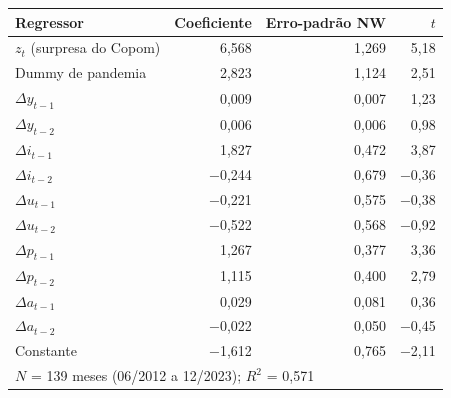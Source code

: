 \begin{tabular}{lrrr}
\toprule
Regressor & Coeficiente & Erro-padrão NW & $t$ \\
\midrule
$z_t$ (surpresa do Copom) & 6{,}568 & 1{,}269 & 5{,}18 \\
Dummy de pandemia & 2{,}823 & 1{,}124 & 2{,}51 \\
$\Delta y_{t-1}$ & 0{,}009 & 0{,}007 & 1{,}23 \\
$\Delta y_{t-2}$ & 0{,}006 & 0{,}006 & 0{,}98 \\
$\Delta i_{t-1}$ & 1{,}827 & 0{,}472 & 3{,}87 \\
$\Delta i_{t-2}$ & \ensuremath{-}0{,}244 & 0{,}679 & \ensuremath{-}0{,}36 \\
$\Delta u_{t-1}$ & \ensuremath{-}0{,}221 & 0{,}575 & \ensuremath{-}0{,}38 \\
$\Delta u_{t-2}$ & \ensuremath{-}0{,}522 & 0{,}568 & \ensuremath{-}0{,}92 \\
$\Delta p_{t-1}$ & 1{,}267 & 0{,}377 & 3{,}36 \\
$\Delta p_{t-2}$ & 1{,}115 & 0{,}400 & 2{,}79 \\
$\Delta a_{t-1}$ & 0{,}029 & 0{,}081 & 0{,}36 \\
$\Delta a_{t-2}$ & \ensuremath{-}0{,}022 & 0{,}050 & \ensuremath{-}0{,}45 \\
Constante & \ensuremath{-}1{,}612 & 0{,}765 & \ensuremath{-}2{,}11 \\
\midrule
\multicolumn{4}{l}{$N$ = 139 meses (06/2012 a 12/2023); $R^2$ = 0{,}571} \\
\bottomrule
\end{tabular}
